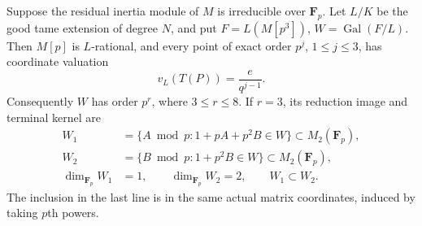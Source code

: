 \begin{lemma}
\label{lem:B-RD79-layers}
Suppose the residual inertia module of \(M\) is irreducible over
\(\mathbf F_p\). Let \(L/K\) be the good tame extension of degree
\(N\), and put \(F=L(M[p^3])\), \(W=\operatorname{Gal}(F/L)\).
Then \(M[p]\) is \(L\)-rational, and every point of exact order
\(p^j\), \(1\le j\le3\), has coordinate valuation
\[
             v_L(T(P))=\frac{e}{q^{j-1}}.
                                                     \tag{B-RD79.1}
\]
Consequently \(W\) has order \(p^r\), where \(3\le r\le8\).
If \(r=3\), its reduction image and terminal kernel are
\[
 \begin{split}
 W_1&=\{A\bmod p:1+pA+p^2B\in W\}\subset M_2(\mathbf F_p),\\
 W_2&=\{B\bmod p:1+p^2B\in W\}\subset M_2(\mathbf F_p),\\
 \dim_{\mathbf F_p}W_1&=1,\qquad
 \dim_{\mathbf F_p}W_2=2,\qquad W_1\subset W_2.
 \end{split}                                         \tag{B-RD79.2}
\]
The inclusion in the last line is in the same actual matrix
coordinates, induced by taking \(p\)th powers.
\end{lemma}
